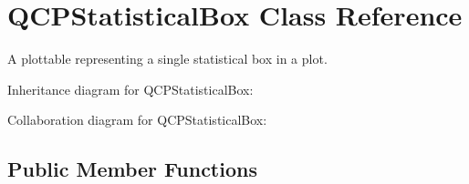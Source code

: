 \hypertarget{classQCPStatisticalBox}{}\section{Q\+C\+P\+Statistical\+Box Class Reference}
\label{classQCPStatisticalBox}


A plottable representing a single statistical box in a plot.  




Inheritance diagram for Q\+C\+P\+Statistical\+Box\+:


Collaboration diagram for Q\+C\+P\+Statistical\+Box\+:
\subsection*{Public Member Functions}
